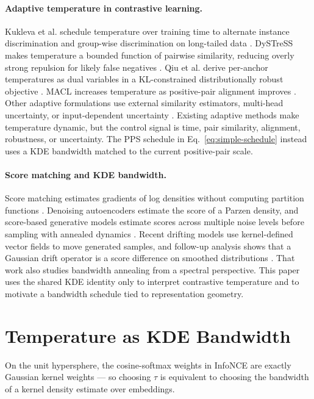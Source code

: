 \documentclass{article}
\begin{document}
\paragraph{Adaptive temperature in contrastive learning.}
Kukleva et al. schedule temperature over training time to alternate instance discrimination and group-wise discrimination on long-tailed data \citep{kukleva2023temperature}. DySTreSS makes temperature a bounded function of pairwise similarity, reducing overly strong repulsion for likely false negatives \citep{manna2024dystress}. Qiu et al. derive per-anchor temperatures as dual variables in a KL-constrained distributionally robust objective \citep{qiu2023not}. MACL increases temperature as positive-pair alignment improves \citep{huang2023model}. Other adaptive formulations use external similarity estimators, multi-head uncertainty, or input-dependent uncertainty \citep{khaertdinov2022dynamic,wang2024adaptive,zhang2021temperature}. Existing adaptive methods make temperature dynamic, but the control signal is time, pair similarity, alignment, robustness, or uncertainty. The PPS schedule in Eq.~\eqref{eq:simple-schedule} instead uses a KDE bandwidth matched to the current positive-pair scale.

\paragraph{Score matching and KDE bandwidth.}
Score matching estimates gradients of log densities without computing partition functions \citep{hyvarinen2005estimation}. Denoising autoencoders estimate the score of a Parzen density, and score-based generative models estimate scores across multiple noise levels before sampling with annealed dynamics \citep{vincent2011connection,song2019generative,ho2020denoising}. Recent drifting models use kernel-defined vector fields to move generated samples, and follow-up analysis shows that a Gaussian drift operator is a score difference on smoothed distributions \citep{deng2026drifting,turan2026generative}. That work also studies bandwidth annealing from a spectral perspective. This paper uses the shared KDE identity only to interpret contrastive temperature and to motivate a bandwidth schedule tied to representation geometry.

\section{Temperature as KDE Bandwidth}\label{sec:kde}

On the unit hypersphere, the cosine-softmax weights in InfoNCE are exactly Gaussian kernel weights — so choosing $\tau$ is equivalent to choosing the bandwidth of a kernel density estimate over embeddings.
\end{document}
